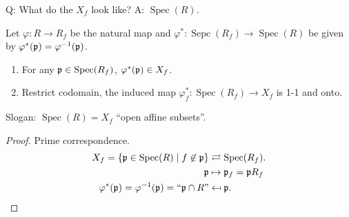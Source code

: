 \begin{remark}
    Q: What do the $X_f$ look like? A: $\operatorname{Spec}(R)$.
\end{remark}

\begin{proposition}
    Let $\varphi: R \to R_f$ be the natural map and $\varphi^*: \operatorname{Sepc}(R_f) \to \operatorname{Spec}(R)$ be given by $\varphi^*(\mathfrak{p}) = \varphi^{-1}(\mathfrak{p})$.
    \begin{enumerate}
        \item For any $\mathfrak{p} \in \operatorname{Spec}(R_f)$, $\varphi^*(\mathfrak{p}) \in X_f$.
        \item Restrict codomain, the induced map $\varphi_f^*: \operatorname{Spec}(R_f) \to X_f$ is 1-1 and onto.
    \end{enumerate}
    Slogan: $\operatorname{Spec}(R) = X_f$ ``open affine subsets''.
\end{proposition}

\begin{proof}
    Prime correspondence.
    \begin{align*}
        X_f = \{\mathfrak{p} \in \operatorname{Spec}(R) \mid f \not \in \mathfrak{p}\} & \rightleftarrows \operatorname{Spec}(R_f). \\
        \mathfrak{p} &\mapsto \mathfrak{p}_f = \mathfrak{p} R_f \\
        \varphi^*(\mathfrak{p}) = \varphi^{-1}(\mathfrak{p}) = \text{``$\mathfrak{p} \cap R$''} &\mapsfrom \mathfrak{p}.
    \end{align*}
\end{proof}

